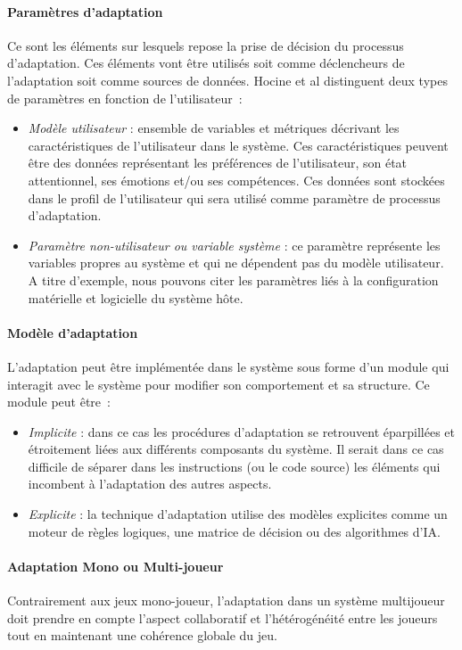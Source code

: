	\paragraph{Paramètres d'adaptation\\}
Ce sont les éléments sur lesquels repose la prise de décision du processus d'adaptation. Ces éléments vont être utilisés soit comme déclencheurs de l'adaptation soit comme sources de données. Hocine et al distinguent deux types de paramètres en fonction de l'utilisateur~:
\begin{itemize}
	\item \emph{Modèle utilisateur} : ensemble de variables et métriques décrivant les caractéristiques de l’utilisateur dans le système. Ces caractéristiques peuvent être des données représentant les préférences de l’utilisateur, son état attentionnel, ses émotions et/ou ses compétences. Ces données sont stockées dans le profil de l’utilisateur qui sera utilisé comme paramètre de processus d’adaptation.
	\item \emph{Paramètre non-utilisateur ou variable système }: ce paramètre représente les variables propres au système et qui ne dépendent pas du modèle utilisateur. A titre d'exemple, nous pouvons citer les paramètres liés à la configuration matérielle et logicielle du système hôte.
\end{itemize}

	\paragraph{Modèle d'adaptation\\}
	L’adaptation peut être implémentée dans le système sous forme d’un module qui interagit avec le système pour modifier son comportement et sa structure. Ce module peut être~:
\begin{itemize}
	\item \emph{Implicite} : dans ce cas les procédures d'adaptation se retrouvent éparpillées et étroitement liées aux différents composants du système. Il serait dans ce cas difficile de séparer dans les instructions (ou le code source) les éléments qui incombent à l'adaptation des autres aspects.
	\item \emph{Explicite }: la technique d'adaptation utilise des modèles explicites comme un moteur de règles logiques, une matrice de décision ou des algorithmes d’IA.
\end{itemize}
	
	\paragraph{Adaptation Mono ou Multi-joueur\\}
Contrairement aux jeux mono-joueur, l'adaptation dans un système multijoueur doit prendre en compte l'aspect collaboratif et l'hétérogénéité entre les joueurs tout  en maintenant une cohérence globale du jeu.
	
